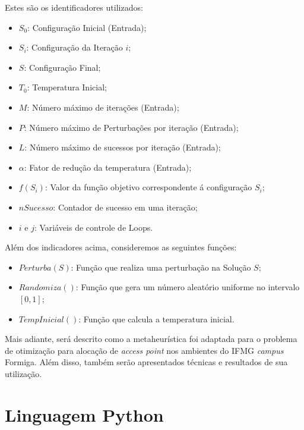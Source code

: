 \documentclass[
	12pt,				%
	twoside,			%
	a4paper,			%
	english,			%
	french,				%
	spanish,			%
	brazil				%
	]{abntex2}
\begin{document}
Estes são os identificadores utilizados:

\begin{itemize}
\item
  \(S_{0}\): Configuração Inicial (Entrada);
\item
  \(S_{i}\): Configuração da Iteração \(i\);
\item
  \(S\): Configuração Final;
\item
  \(T_{0}\): Temperatura Inicial;
\item
  \(M\): Número máximo de iterações (Entrada);
\item
  \(P\): Número máximo de Perturbações por iteração (Entrada);
\item
  \(L\): Número máximo de sucessos por iteração (Entrada);
\item
  \(\alpha\): Fator de redução da temperatura (Entrada);
\item
  \(f(S_{i})\): Valor da função objetivo correspondente á configuração
  \(S_{i}\);
\item
  \(nSucesso\): Contador de sucesso em uma iteração;
\item
  \(i\) e \(j\): Variáveis de controle de Loops.
\end{itemize}

Além dos indicadores acima, consideremos as seguintes funções:

\begin{itemize}
\item
  \(Perturba(S)\): Função que realiza uma perturbação na Solução \(S\);
\item
  \(Randomiza()\): Função que gera um número aleatório uniforme no
  intervalo \([0, 1]\);
\item
  \(TempInicial()\): Função que calcula a temperatura inicial.
\end{itemize}

Mais adiante, será descrito como a metaheurística foi adaptada para o
problema de otimização para alocação de \emph{access point} nos
ambientes do IFMG \emph{campus} Formiga. Além disso, também serão
apresentados técnicas e resultados de sua utilização.

\section{Linguagem Python}\label{linguagem-python}
\end{document}
